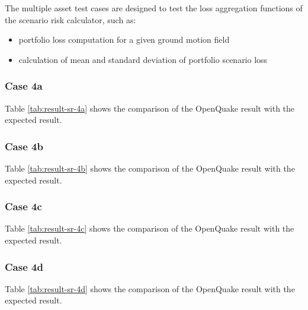 The multiple asset test cases are designed to test the loss aggregation functions of the scenario risk calculator, such as:

\begin{itemize}
\item portfolio loss computation for a given ground motion field
\item calculation of mean and standard deviation of portfolio scenario loss
\end{itemize}

\subsubsection{Case 4a}


Table \ref{tab:result-sr-4a} shows the comparison of the OpenQuake result with the expected result.

\subsubsection{Case 4b}


Table \ref{tab:result-sr-4b} shows the comparison of the OpenQuake result with the expected result.
\subsubsection{Case 4c}


Table \ref{tab:result-sr-4c} shows the comparison of the OpenQuake result with the expected result.

\subsubsection{Case 4d}


Table \ref{tab:result-sr-4d} shows the comparison of the OpenQuake result with the expected result.

